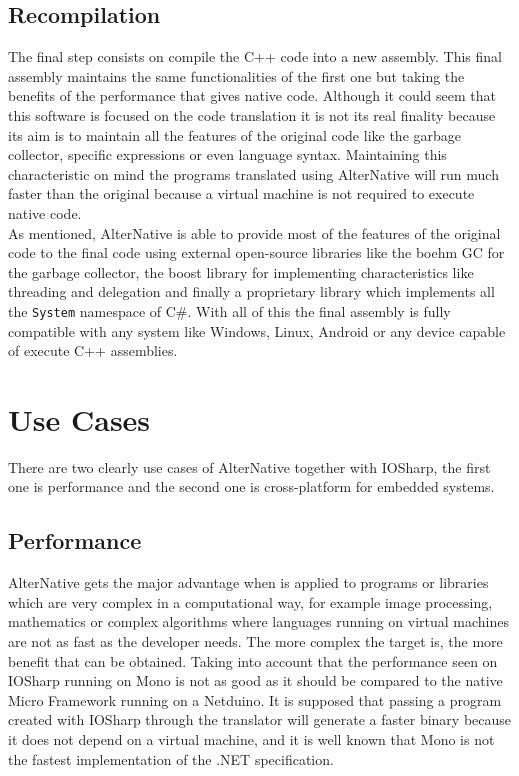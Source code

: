 \subsection{Recompilation}\label{SS:AN-Process-Recompilation}
The final step consists on compile the C++ code into a new assembly. This final assembly maintains the same functionalities of the first one but taking the benefits of the performance that gives native code. Although it could seem that this software is focused on the code translation it is not its real finality because its aim is to maintain all the features of the original code like the garbage collector, specific expressions or even language syntax. Maintaining this characteristic on mind the programs translated using AlterNative will run much faster than the original because a virtual machine is not required to execute native code.
\\
As mentioned, AlterNative is able to provide most of the features of the original code to the final code using external open-source libraries like the boehm GC for the garbage collector, the boost library for implementing characteristics like threading and delegation and finally a proprietary library which implements all the \verb!System! namespace of C\#. With all of this the final assembly is fully compatible with any system like Windows, Linux, Android or any device capable of execute C++ assemblies.

\section{Use Cases}\label{S:AN-Use-Cases}
There are two clearly use cases of AlterNative together with IOSharp, the first one is performance and the second one is cross-platform for embedded systems.
\subsection{Performance}\label{SS:AN-Use-Cases-Perf}
AlterNative gets the major advantage when is applied to programs or libraries which are very complex in a computational way, for example image processing, mathematics or complex algorithms where languages running on virtual machines are not as fast as the developer needs. The more complex the target is, the more benefit that can be obtained.
Taking into account that the performance seen on IOSharp running on Mono is not as good as it should be compared to the native Micro Framework running on a Netduino. It is supposed that passing a program created with IOSharp through the translator will generate a faster binary because it does not depend on a virtual machine, and it is well known that Mono is not the fastest implementation of the .NET specification.

